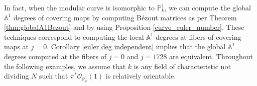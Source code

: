 \documentclass[12pt, reqno]{amsart}
\theoremstyle{definition}
\newtheorem{remark}[theorem]{Remark}
\newcommand{\A}{\mathbb{A}} %
\newcommand{\Proj}{\mathbb{P}} %
\newcommand{\Adeg}{\deg^{\mathbb{A}^1}} %
\newcommand{\Oh}{\mathscr{O}} %
\newcommand{\Tr}{\mathrm{Tr}} %
\newcommand{\nAdeg}{\mathrm{ndeg}^{\mathbb{A}^1}} %
\begin{document}

In fact, when the modular curve is isomorphic to $\Proj^1_k$, we can compute the global $\A^1$ degrees of covering maps by computing B\'ezout matrices as per Theorem \ref{thm:globalA1Bezout} and by using Proposition \ref{curve_euler_number}. These techniques correspond to computing the local $\A^1$ degrees at fibers of covering maps at $j = 0$. Corollary \ref{euler deg independent} implies that the global $\A^1$ degrees computed at the fibers of $j = 0$ and $j = 1728$ are equivalent. Throughout the following examples, we assume that $k$ is any field of characteristic not dividing $N$ such that $\pi^* \Oh_{\Proj^1_k}(1)$ is relatively orientable.
\end{document}
